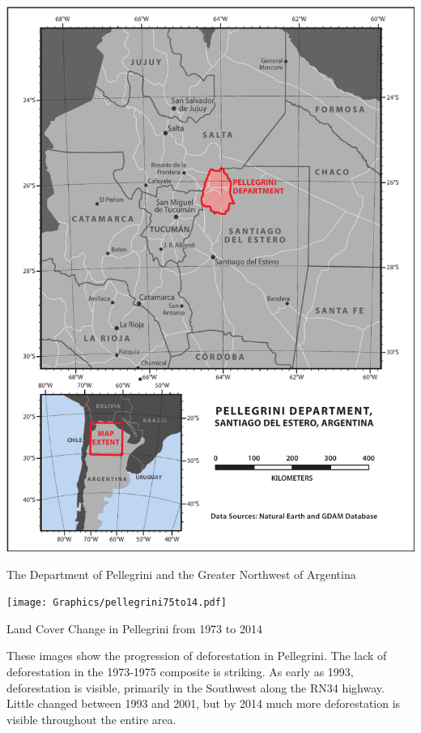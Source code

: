 \begin{ssfigure}
  \centering
  \includegraphics[width=\textwidth]{Graphics/argentinaOverview.pdf}
  \caption{The Department of Pellegrini and the Greater Northwest of Argentina}
  \label{map:argentinaOverview}
\end{ssfigure}

\begin{ssfigure}
  \centering
  \texttt{[image: Graphics/pellegrini75to14.pdf]}
  \caption{Land Cover Change in Pellegrini from 1973 to 2014}
  \label{map:pellegriniCoverChange}
  \medskip
  \small
  These images show the progression of deforestation in Pellegrini. The lack of deforestation in the 1973-1975 composite is striking. As early as 1993, deforestation is visible, primarily in the Southwest along the RN34 highway. Little changed between 1993 and 2001, but by 2014 much more deforestation is visible throughout the entire area.
\end{ssfigure}

